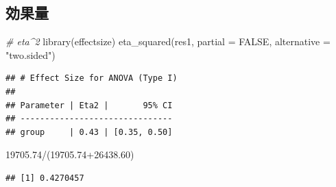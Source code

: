 \documentclass[
  ja=standard, xelatex, base=12pt]{bxjsreport}
\newenvironment{Shaded}{\begin{snugshade}}{\end{snugshade}}
\newcommand{\AttributeTok}[1]{\textcolor[rgb]{0.77,0.63,0.00}{#1}}
\newcommand{\CommentTok}[1]{\textcolor[rgb]{0.56,0.35,0.01}{\textit{#1}}}
\newcommand{\ConstantTok}[1]{\textcolor[rgb]{0.00,0.00,0.00}{#1}}
\newcommand{\DecValTok}[1]{\textcolor[rgb]{0.00,0.00,0.81}{#1}}
\newcommand{\FloatTok}[1]{\textcolor[rgb]{0.00,0.00,0.81}{#1}}
\newcommand{\FunctionTok}[1]{\textcolor[rgb]{0.00,0.00,0.00}{#1}}
\newcommand{\NormalTok}[1]{#1}
\newcommand{\OtherTok}[1]{\textcolor[rgb]{0.56,0.35,0.01}{#1}}
\newcommand{\SpecialCharTok}[1]{\textcolor[rgb]{0.00,0.00,0.00}{#1}}
\newcommand{\StringTok}[1]{\textcolor[rgb]{0.31,0.60,0.02}{#1}}
\begin{document}
\hypertarget{ux52b9ux679cux91cf}{%
\subsection{効果量}\label{ux52b9ux679cux91cf}}

\begin{Shaded}
\begin{Highlighting}[]
\CommentTok{\# eta\^{}2}
\FunctionTok{library}\NormalTok{(effectsize)}
\FunctionTok{eta\_squared}\NormalTok{(res1, }\AttributeTok{partial =} \ConstantTok{FALSE}\NormalTok{, }\AttributeTok{alternative =} \StringTok{"two.sided"}\NormalTok{)}
\end{Highlighting}
\end{Shaded}

\begin{verbatim}
## # Effect Size for ANOVA (Type I)
## 
## Parameter | Eta2 |       95% CI
## -------------------------------
## group     | 0.43 | [0.35, 0.50]
\end{verbatim}

\begin{Shaded}
\begin{Highlighting}[]
\FloatTok{19705.74}\SpecialCharTok{/}\NormalTok{(}\FloatTok{19705.74+26438.60}\NormalTok{)}
\end{Highlighting}
\end{Shaded}

\begin{verbatim}
## [1] 0.4270457
\end{verbatim}

\begin{Shaded}
\end{Shaded}
\end{document}
